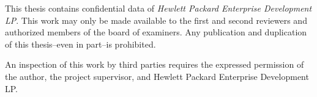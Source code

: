 This thesis contains confidential data of \textit{Hewlett Packard Enterprise Development LP}. This work may only be made available to the first and second reviewers and authorized members of the board of examiners. Any publication and duplication of this thesis--even in part--is prohibited.

An inspection of this work by third parties requires the expressed permission of the author, the project supervisor, and Hewlett Packard Enterprise Development LP.